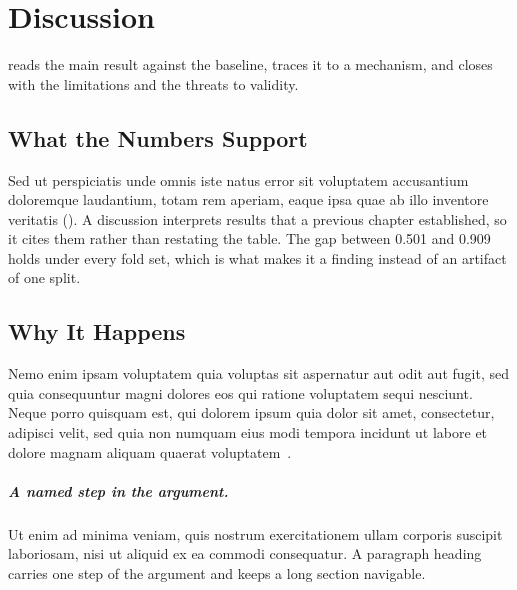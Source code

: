 \chapter{Discussion}
\label{chap:discussion}

 reads the main result against the baseline,  traces it to a mechanism, and  closes with the limitations and the threats to validity.

\section{What the Numbers Support}
\label{sec:disc-reading}

Sed ut perspiciatis unde omnis iste natus error sit voluptatem accusantium doloremque laudantium, totam rem aperiam, eaque ipsa quae ab illo inventore veritatis ().
A discussion interprets results that a previous chapter established, so it cites them rather than restating the table.
The gap between 0.501 and 0.909 holds under every fold set, which is what makes it a finding instead of an artifact of one split.

\section{Why It Happens}
\label{sec:disc-mechanism}

Nemo enim ipsam voluptatem quia voluptas sit aspernatur aut odit aut fugit, sed quia consequuntur magni dolores eos qui ratione voluptatem sequi nesciunt.
Neque porro quisquam est, qui dolorem ipsum quia dolor sit amet, consectetur, adipisci velit, sed quia non numquam eius modi tempora incidunt ut labore et dolore magnam aliquam quaerat voluptatem~\cite{example_JournalArticle_2023}.

\paragraph{A named step in the argument.}
Ut enim ad minima veniam, quis nostrum exercitationem ullam corporis suscipit laboriosam, nisi ut aliquid ex ea commodi consequatur.
A paragraph heading carries one step of the argument and keeps a long section navigable.



